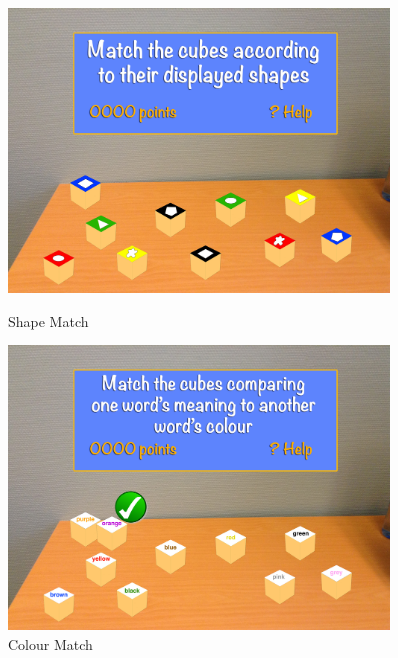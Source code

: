 \begin{figure}[h]
	\centering
	\begin{minipage}{.5\textwidth}
		\capstart
		\centering
		\includegraphics[width=0.9\textwidth]{images/Costas/game_mockup1(matching).jpg}
		\vspace{-10pt}
		\caption{Shape Match}
		\label{fig:Costas_shape_match}
	\end{minipage}%
	\begin{minipage}{.5\textwidth}
		\capstart
		\centering
		\includegraphics[width=0.9\textwidth]{images/Costas/game_mockup1(matching2).jpg}
		\vspace{-10pt}
		\caption{Colour Match}
		\label{fig:Costas_colour_match}
	\end{minipage}%
\end{figure}

